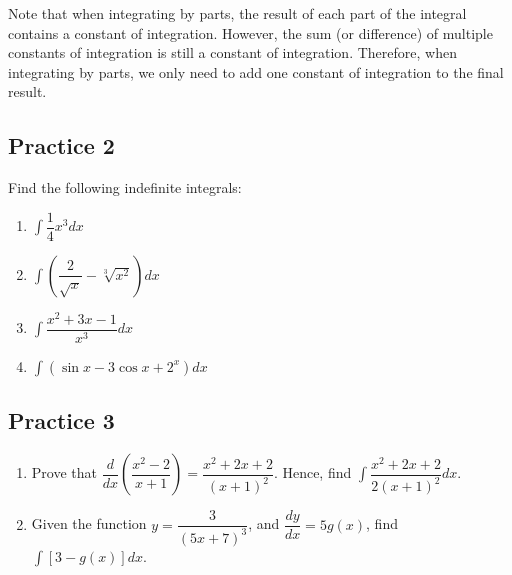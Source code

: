 \documentclass{report}
\begin{document}
Note that when integrating by parts, the result of each part of the integral
contains a constant of integration. However, the sum (or difference) of
multiple constants of integration is still a constant of integration.
Therefore, when integrating by parts, we only need to add one constant of
integration to the final result.

\subsection{Practice 2}
Find the following indefinite integrals:
\begin{enumerate}
    \item $\displaystyle\int{\dfrac{1}{4}}x^{3}dx$
    \item $\displaystyle\int{\left(\dfrac{2}{\sqrt{x}} - \sqrt[3]{x^2}\right)dx}$
    \item $\displaystyle\int{\dfrac{x^2 + 3x - 1}{x^3}}dx$
    \item $\displaystyle\int{\left(\sin x - 3\cos x + 2^x\right)dx}$
\end{enumerate}

\subsection{Practice 3}
\begin{enumerate}
    \item Prove that $\dfrac{d}{dx}\left(\dfrac{x^2 - 2}{x + 1}\right) = \dfrac{x^2 + 2x
                  + 2}{(x + 1)^2}$. Hence, find $\displaystyle\int{\dfrac{x^2 + 2x +
                      2}{2(x+1)^2}}dx$.
    \item Given the function $y = \dfrac{3}{(5x + 7)^3}$, and $\dfrac{dy}{dx} = 5g(x)$,
          find $\displaystyle\int\left[3 - g(x)\right]dx$.
\end{enumerate}
\end{document}

